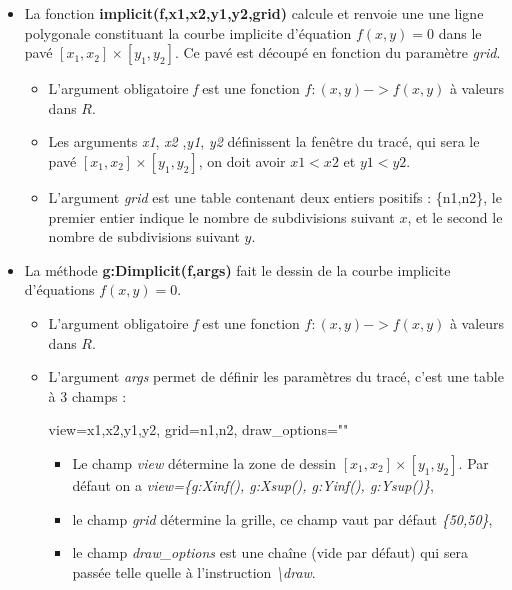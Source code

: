 \documentclass[%
10pt,%
a4paper,%
french,%
]%
{article}%
\begin{document}
\begin{itemize}
\item La fonction \textbf{implicit(f,x1,x2,y1,y2,grid)} calcule et renvoie une une ligne polygonale constituant la courbe implicite d'équation $f(x,y)=0$ dans le pavé $[x_1,x_2]\times[y_1,y_2]$. Ce pavé est découpé en fonction du paramètre \emph{grid}.

      \begin{itemize}
      \item L'argument obligatoire \emph{f} est une fonction \(f: (x,y) -> f(x,y)\) à valeurs dans \(R\).
      \item Les arguments \emph{x1}, \emph{x2} ,\emph{y1}, \emph{y2} définissent la fenêtre du tracé, qui sera le pavé $[x_1,x_2]\times[y_1,y_2]$, on doit avoir \(x1<x2\) et \(y1<y2\).
      \item L'argument \emph{grid} est une table contenant deux entiers positifs : \{n1,n2\}, le premier entier indique le nombre de subdivisions suivant $x$, et le second le nombre de subdivisions suivant $y$.
      \end{itemize}
  
\item La méthode \textbf{g:Dimplicit(f,args)} fait le dessin de la courbe implicite d'équations $f(x,y)=0$.

      \begin{itemize}
      \item L'argument obligatoire \emph{f} est une fonction \(f: (x,y) -> f(x,y)\) à valeurs dans \(R\).
      \item   L'argument \emph{args} permet de définir les paramètres du tracé, c'est une table à 3 champs :
      
      \begin{TeXcode}
      { view={x1,x2,y1,y2}, grid={n1,n2}, draw_options="" }
      \end{TeXcode}
            \begin{itemize}
                \item Le champ \emph{view} détermine la zone de dessin $[x_1,x_2]\times[y_1,y_2]$.  Par défaut on a \emph{view=\{g:Xinf(), g:Xsup(), g:Yinf(), g:Ysup()\}},
                \item le champ \emph{grid} détermine la grille, ce champ vaut par défaut \emph{\{50,50\}},
                \item le champ \emph{draw\_options} est une chaîne (vide par défaut) qui sera passée telle quelle à l'instruction \emph{\textbackslash draw}.
            \end{itemize}
      \end{itemize}
\end{itemize}
\end{document}

